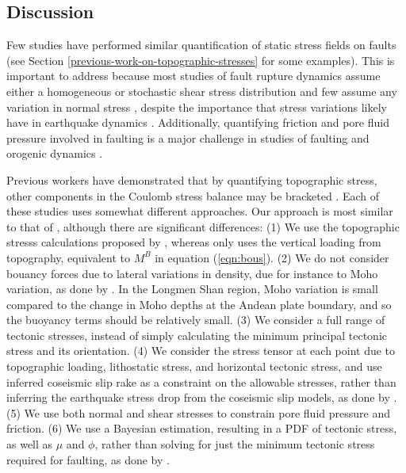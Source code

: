 \documentclass[twocolumn,jgrga]{AGUTeX}
\begin{document}
\begin{article}
\section{Discussion}\label{discussion}

Few studies have performed similar quantification of static stress
fields on faults (see Section
\ref{previous-work-on-topographic-stresses} for some examples). This is
important to address because most studies of fault rupture dynamics
assume either a homogeneous or stochastic shear stress distribution
\citep[e.g.,][]{oglesbyday2002} and few assume any variation in normal
stress \citep[e.g.,][]{aagaard2001}, despite the importance that stress
variations likely have in earthquake dynamics \citep[e.g.,][]{day1982,
olsen1997}. Additionally, quantifying friction and pore fluid
pressure involved in faulting is a major challenge in studies of
faulting and orogenic dynamics \citep[e.g.,][]{meissner1982,
oglesbyday2002}.

Previous workers have demonstrated that by quantifying topographic
stress, other components in the Coulomb stress balance may be bracketed
\citep[e.g.,][]{cattin1997, lamb2006, luttrell2011}. Each of these studies
uses somewhat different approaches. Our approach is most similar to that
of \citet{luttrell2011}, although there are significant
differences: (1) We use the topographic stresss calculations proposed by
\citet{liuzoback1992}, whereas 
\citet{luttrell2011} only uses the vertical loading from topography,
equivalent to $M^B$ in equation (\ref{eqn:bous}). (2) We do not consider
bouancy forces due to lateral variations in density, due for instance to
Moho variation, as done by \citet{luttrell2011}. In the
Longmen Shan region, Moho variation is small compared to the change in
Moho depths at the Andean plate boundary, and so the buoyancy terms
should be relatively small. (3) We consider a full range of tectonic
stresses, instead of simply calculating the minimum principal tectonic
stress and its orientation. (4) We consider the stress tensor at each
point due to topographic loading, lithostatic stress, and horizontal
tectonic stress, and use inferred coseismic slip rake as a constraint on
the allowable stresses, rather than inferring the earthquake stress drop
from the coseismic slip models, as done by 
\citet{luttrell2011}. (5) We use both normal and shear stresses to
constrain pore fluid pressure and friction. (6) We use a Bayesian
estimation, resulting in a PDF of tectonic stress, as well as $\mu$ and
$\phi$, rather than solving for just the minimum tectonic stress
required for faulting, as done by \citet{luttrell2011}.


\end{article}
\end{document}
